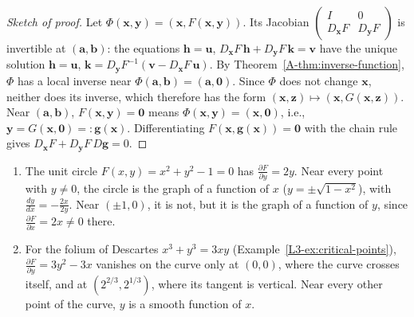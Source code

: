 \begin{proof}[Sketch of proof]
    Let $\Phi(\mathbf{x}, \mathbf{y}) = (\mathbf{x}, F(\mathbf{x}, \mathbf{y}))$. Its Jacobian $\begin{pmatrix} I & 0 \\ D_{\mathbf{x}}F & D_{\mathbf{y}}F \end{pmatrix}$ is invertible at $(\mathbf{a}, \mathbf{b})$: the equations $\mathbf{h} = \mathbf{u}$, $D_{\mathbf{x}}F\,\mathbf{h} + D_{\mathbf{y}}F\,\mathbf{k} = \mathbf{v}$ have the unique solution $\mathbf{h} = \mathbf{u}$, $\mathbf{k} = D_{\mathbf{y}}F^{-1}(\mathbf{v} - D_{\mathbf{x}}F\,\mathbf{u})$. By Theorem~\ref{A-thm:inverse-function}, $\Phi$ has a local inverse near $\Phi(\mathbf{a}, \mathbf{b}) = (\mathbf{a}, \mathbf{0})$. Since $\Phi$ does not change $\mathbf{x}$, neither does its inverse, which therefore has the form $(\mathbf{x}, \mathbf{z}) \mapsto (\mathbf{x}, G(\mathbf{x}, \mathbf{z}))$. Near $(\mathbf{a}, \mathbf{b})$, $F(\mathbf{x}, \mathbf{y}) = \mathbf{0}$ means $\Phi(\mathbf{x}, \mathbf{y}) = (\mathbf{x}, \mathbf{0})$, i.e., $\mathbf{y} = G(\mathbf{x}, \mathbf{0}) =: \mathbf{g}(\mathbf{x})$. Differentiating $F(\mathbf{x}, \mathbf{g}(\mathbf{x})) = \mathbf{0}$ with the chain rule gives $D_{\mathbf{x}}F + D_{\mathbf{y}}F\,D\mathbf{g} = 0$.
\end{proof}

\begin{example}\label{A-ex:implicit}
    \begin{enumerate}
        \item The unit circle $F(x, y) = x^2 + y^2 - 1 = 0$ has $\frac{\partial F}{\partial y} = 2y$. Near every point with $y \neq 0$, the circle is the graph of a function of $x$ ($y = \pm\sqrt{1 - x^2}$), with $\frac{dy}{dx} = -\frac{2x}{2y}$. Near $(\pm 1, 0)$, it is not, but it is the graph of a function of $y$, since $\frac{\partial F}{\partial x} = 2x \neq 0$ there.
        \item For the folium of Descartes $x^3 + y^3 = 3xy$ (Example~\ref{L3-ex:critical-points}), $\frac{\partial F}{\partial y} = 3y^2 - 3x$ vanishes on the curve only at $(0, 0)$, where the curve crosses itself, and at $(2^{2/3}, 2^{1/3})$, where its tangent is vertical. Near every other point of the curve, $y$ is a smooth function of $x$.
    \end{enumerate}
\end{example}

